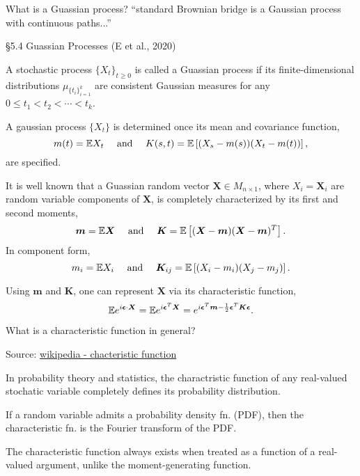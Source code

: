 \begin{quest}
	\item What is a Guassian process? ``standard Brownian bridge is a Gaussian process with continuous paths...''
	\begin{ans}
		\S 5.4 Guassian Processes (E et al., 2020)

		\cloze A stochastic process $\{ X_t \}_{t\geq 0}$ is called a Guassian process if its finite-dimensional distributions $\mu_{ \{t_i\}_{i=1}^k }$ are consistent Gaussian measures for any $0\leq t_1 < t_2 < \cdots < t_k$. 

		\cloze A gaussian process $\{ X_t\}$ is determined once its mean and covariance function, 
		\[
			m(t) = \mathbb{E} X_t \quad\text{ and }\quad 
			K(s, t) = \mathbb{E}\left[ (X_s - m(s))(X_t - m(t)) \right],
		\]
		are specified.

		\cloze It is well known that a Guassian random vector $\bm{X} \in M_{n\times 1}$, where $X_i = \bm{X}_i$ are random variable components of $\bm{X}$, is completely characterized by its first and second moments, 
		\[
			\bm{m} = \mathbb{E}\bm{X} \quad\text{ and }\quad
			\bm{K} = \mathbb{E}\left[ (\bm{X} - \bm{m}) (\bm{X} - \bm{m})^T \right]. 	
		\] In component form, 
		\[ m_i = \mathbb{E} X_i \quad\text{ and }\quad 
			\bm{K}_{ij} = \mathbb{E} \left[ (X_i - m_i) (X_j - m_j) \right].
		\] 

		\cloze Using $\bm{m}$ and $\bm{K}$, one can represent $\bm{X}$ via its characteristic function, 
		\[ \mathbb{E} e^{i\bm{\epsilon}\cdot \bm{X}} = \mathbb{E} e^{i\bm{\epsilon}^T\bm{X}}
			= e^{i\bm{\epsilon}^T \bm{m} 
				- \frac{1}{2} \bm{\epsilon}^T\bm{K} \bm{\epsilon} } .\]
	\end{ans}

	\item What is a characteristic function in general? 
	\begin{ans}
	Source: \href{https://en.wikipedia.org/wiki/Characteristic_function_(probability_theory)}{wikipedia - chacteristic function}

	\cloze In probability theory and statistics, the charactristic function of any real-valued stochatic variable completely defines its probability distribution.

	\cloze If a random variable admits a probability density fn. (PDF), then the characteristic fn. is the Fourier transform of the PDF. 

	\cloze The characteristic function always exists when treated as a function of a real-valued argument, unlike the moment-generating function. 


\end{ans}
\end{quest}
